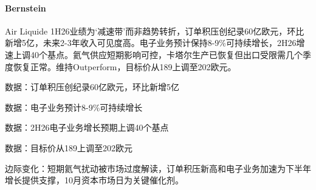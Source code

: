 \documentclass[11pt]{ctexart}
\begin{document}
\paragraph{Bernstein} Air Liquide 1H26业绩为‘减速带’而非趋势转折，订单积压创纪录60亿欧元，环比新增5亿，未来2-3年收入可见度高。电子业务预计保持8-9\%可持续增长，2H26增速上调40个基点。氦气供应短期影响可控，卡塔尔生产已恢复但出口受限需几个季度恢复正常。维持Outperform，目标价从189上调至202欧元。
{\small\color{refgray}数据：订单积压创纪录60亿欧元，环比新增5亿\par}
{\small\color{refgray}数据：电子业务预计8-9\%可持续增长\par}
{\small\color{refgray}数据：2H26电子业务增长预期上调40个基点\par}
{\small\color{refgray}数据：目标价从189上调至202欧元\par}
{\small\color{refgray}边际变化：短期氦气扰动被市场过度解读，订单积压新高和电子业务加速为下半年增长提供支撑，10月资本市场日为关键催化剂。\par}
\end{document}
